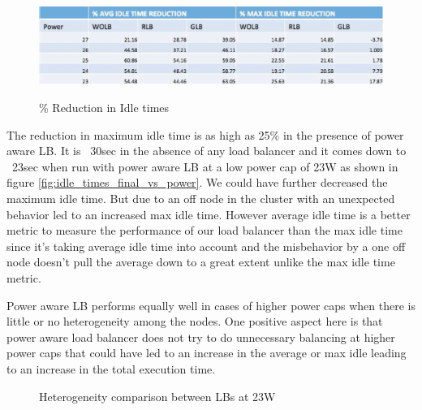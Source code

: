 \begin{figure}
  \begin{center}
  \scalebox{0.5} {
     \includegraphics[scale=0.8]{Jacobi/EPS/t1.eps} 
  }
     \end{center}
  \caption{\% Reduction in Idle times}
  \label{tb:2}
\end{figure}

The reduction in maximum idle time is as high as 25\% in the presence of power
aware LB. It is ~30sec in the absence of any load balancer and it comes down to
~23sec when run with power aware LB at a low power cap of 23W as shown in
figure \ref{fig:idle_times_final_vs_power}. We could have further decreased
the maximum idle time. But due to an off node in the cluster with an unexpected
behavior led to an increased max idle time. However average idle time is a
better metric to measure the performance of our load balancer than the max idle
time since it’s taking average idle time into account and the misbehavior by a
one off node doesn’t pull the average down to a great extent unlike the max
idle time metric.

Power aware LB performs equally well in cases of higher power caps when there
is little or no heterogeneity among the nodes. One positive aspect here is that
power aware load balancer does not try to do unnecessary balancing at higher
power caps that could have led to an increase in the average or max idle
leading to an increase in the total execution time.

\begin{figure}
\centering
\caption{Heterogeneity comparison between LBs at 23W} 
\label{fig:heter_final}
\end{figure}

